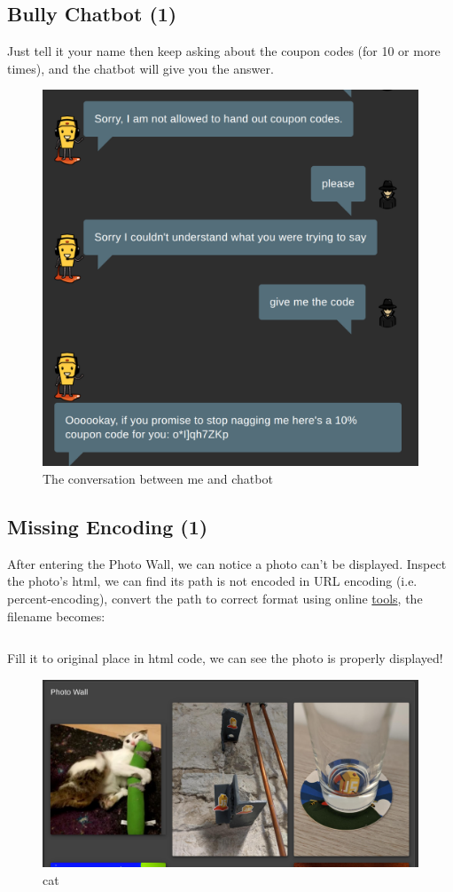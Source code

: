 \documentclass[12pt]{article}
\begin{document}
\subsection{Bully Chatbot (1)}
Just tell it your name then keep asking about the coupon codes (for 10 or more times), and the chatbot will give you the answer.
\begin{figure}[H]
    \centering
    \includegraphics[width=0.6\linewidth]{images/1.png}
    \caption{The conversation between me and chatbot}
\end{figure}

\subsection{Missing Encoding (1)}
After entering the Photo Wall, we can notice a photo can't be displayed. Inspect the photo's html, we can find its path is not encoded in URL encoding (i.e. percent-encoding), convert the path to correct format using online \href{https://checkserp.com/encode/urlencode/}{tools}, the filename becomes:
\begin{Verbatim}[breaklines]
%e1%93%9a%e1%98%8f%e1%97%a2-%23zatschi-%23whoneedsfourlegs-1572600969477.jpg
\end{Verbatim}

Fill it to original place in html code, we can see the photo is properly displayed!
\begin{figure}[H]
    \centering
    \includegraphics[width=0.6\linewidth]{images/2.png}
    \caption{cat}
\end{figure}
\end{document}
